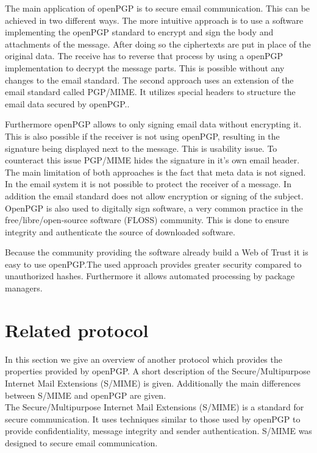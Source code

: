 The main application of openPGP is to secure email communication. This can be achieved in two different ways. The more intuitive approach is to use a software implementing the openPGP standard to encrypt and sign the body and attachments of the message. After doing so the ciphertexts are put in place of the original data. The receive has to reverse that process by using a openPGP implementation to decrypt the message parts. This is possible without any changes to the email standard. The second approach uses an extension of the email standard called PGP/MIME. It utilizes special headers to structure the email data secured by openPGP..

Furthermore openPGP allows to only signing email data without encrypting it. This is also possible if the receiver is not using openPGP, resulting in the signature being displayed next to the message. This is usability issue. To counteract this issue PGP/MIME hides the signature in it's own email header. \\


The main limitation of both approaches is the fact that meta data is not signed. In the email system it is not possible to protect the receiver of a message. In addition the email standard does not allow encryption or signing of the subject. \\

OpenPGP is also used to digitally sign software, a very common practice in the free/libre/open-source software (FLOSS) community. This is done to ensure integrity and authenticate the source of downloaded software. 

Because the community providing the software already build a Web of Trust it is easy to use openPGP.The used approach provides greater security compared to unauthorized hashes. Furthermore it allows automated processing by package managers.

\section{Related protocol} \label{section:openpgp:smime}

In this section we give an overview of another protocol which provides the properties provided by openPGP. A short description of the Secure/Multipurpose Internet Mail Extensions (S/MIME) is given. Additionally the main differences between S/MIME and openPGP are given. \\

The Secure/Multipurpose Internet Mail Extensions (S/MIME) is a standard for secure communication. It uses techniques similar to those used by openPGP to provide confidentiality, message integrity and sender authentication. S/MIME was designed to secure email communication.  \\

